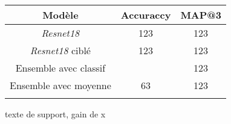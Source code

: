 \begin{center}
\setlength{\tabcolsep}{5mm}
\begin{tabular}{c c c}
\toprule
\textbf{Modèle} & \textbf{Accuraccy} & \textbf{MAP@3}  \\



\midrule

\textit{Resnet18} & 123&123 \\
\textit{Resnet18} ciblé & 123&123 \\
Ensemble avec classif  & {142} &123       \\
Ensemble avec moyenne     & 63&123          \\



\bottomrule
\addlinespace[3mm]
\end{tabular}
\end{center}

texte de support, gain de x

